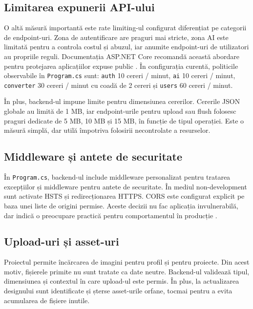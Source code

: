 \subsection{Limitarea expunerii API-ului}

O altă măsură importantă este rate limiting-ul configurat diferențiat pe categorii de endpoint-uri. Zona de autentificare are praguri mai stricte, zona AI este limitată pentru a controla costul și abuzul, iar anumite endpoint-uri de utilizatori au propriile reguli. Documentația ASP.NET Core recomandă această abordare pentru protejarea aplicațiilor expuse public \cite{aspnetRateLimiting2025}. În configurația curentă, politicile observabile în \texttt{Program.cs} sunt: \texttt{auth} 10 cereri / minut, \texttt{ai} 10 cereri / minut, \texttt{converter} 30 cereri / minut cu coadă de 2 cereri și \texttt{users} 60 cereri / minut.

În plus, backend-ul impune limite pentru dimensiunea cererilor. Cererile JSON globale au limită de 1 MB, iar endpoint-urile pentru upload sau flush folosesc praguri dedicate de 5 MB, 10 MB și 15 MB, în funcție de tipul operației. Este o măsură simplă, dar utilă împotriva folosirii necontrolate a resurselor.

\subsection{Middleware și antete de securitate}

În \texttt{Program.cs}, backend-ul include middleware personalizat pentru tratarea excepțiilor și middleware pentru antete de securitate. În mediul non-development sunt activate HSTS și redirecționarea HTTPS. CORS este configurat explicit pe baza unei liste de origini permise. Aceste decizii nu fac aplicația invulnerabilă, dar indică o preocupare practică pentru comportamentul în producție \cite{aspnetCors2024,aspnetErrorHandling2025}.

\subsection{Upload-uri și asset-uri}

Proiectul permite încărcarea de imagini pentru profil și pentru proiecte. Din acest motiv, fișierele primite nu sunt tratate ca date neutre. Backend-ul validează tipul, dimensiunea și contextul în care upload-ul este permis. În plus, la actualizarea designului sunt identificate și șterse asset-urile orfane, tocmai pentru a evita acumularea de fișiere inutile.

